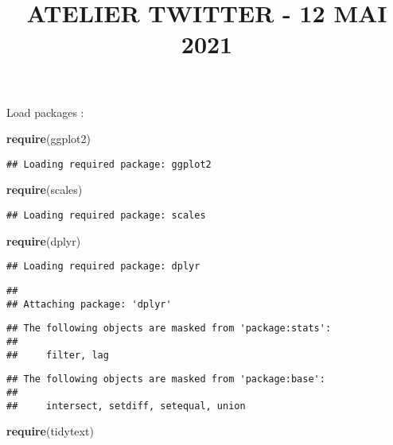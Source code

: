 \documentclass[
]{article}
\title{ATELIER TWITTER - 12 MAI 2021}
\author{}
\date{\vspace{-2.5em}}
\newenvironment{Shaded}{\begin{snugshade}}{\end{snugshade}}
\newcommand{\KeywordTok}[1]{\textcolor[rgb]{0.13,0.29,0.53}{\textbf{#1}}}
\newcommand{\NormalTok}[1]{#1}
\begin{document}
\maketitle

Load packages :

\begin{Shaded}
\begin{Highlighting}[]
\KeywordTok{require}\NormalTok{(ggplot2)}
\end{Highlighting}
\end{Shaded}

\begin{verbatim}
## Loading required package: ggplot2
\end{verbatim}

\begin{Shaded}
\begin{Highlighting}[]
\KeywordTok{require}\NormalTok{(scales)}
\end{Highlighting}
\end{Shaded}

\begin{verbatim}
## Loading required package: scales
\end{verbatim}

\begin{Shaded}
\begin{Highlighting}[]
\KeywordTok{require}\NormalTok{(dplyr)}
\end{Highlighting}
\end{Shaded}

\begin{verbatim}
## Loading required package: dplyr
\end{verbatim}

\begin{verbatim}
## 
## Attaching package: 'dplyr'
\end{verbatim}

\begin{verbatim}
## The following objects are masked from 'package:stats':
## 
##     filter, lag
\end{verbatim}

\begin{verbatim}
## The following objects are masked from 'package:base':
## 
##     intersect, setdiff, setequal, union
\end{verbatim}

\begin{Shaded}
\begin{Highlighting}[]
\KeywordTok{require}\NormalTok{(tidytext)}
\end{Highlighting}
\end{Shaded}
\end{document}
